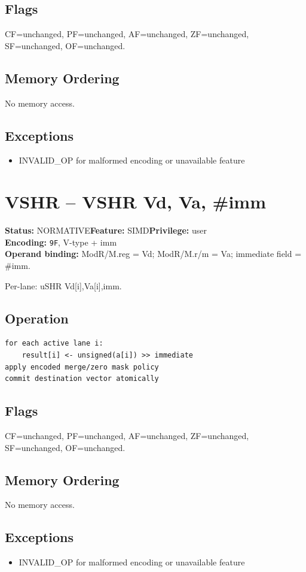 \documentclass[10pt]{article}
\begin{document}
\subsection*{Flags}
CF=unchanged, PF=unchanged, AF=unchanged, ZF=unchanged, SF=unchanged, OF=unchanged.
\subsection*{Memory Ordering}
No memory access.
\subsection*{Exceptions}
\begin{itemize}
\item INVALID\_OP for malformed encoding or unavailable feature
\end{itemize}
\clearpage

\section{VSHR -- VSHR Vd, Va, \#imm}
\textbf{Status:} NORMATIVE\quad \textbf{Feature:} SIMD\quad \textbf{Privilege:} user\\
\textbf{Encoding:} \texttt{9F}, V-type + imm\\
\textbf{Operand binding:} ModR/M.reg = Vd; ModR/M.r/m = Va; immediate field = \#imm.

Per-lane: uSHR Vd[i],Va[i],imm.

\subsection*{Operation}
\begin{lstlisting}
for each active lane i:
    result[i] <- unsigned(a[i]) >> immediate
apply encoded merge/zero mask policy
commit destination vector atomically
\end{lstlisting}
\subsection*{Flags}
CF=unchanged, PF=unchanged, AF=unchanged, ZF=unchanged, SF=unchanged, OF=unchanged.
\subsection*{Memory Ordering}
No memory access.
\subsection*{Exceptions}
\begin{itemize}
\item INVALID\_OP for malformed encoding or unavailable feature
\end{itemize}
\clearpage
\end{document}
